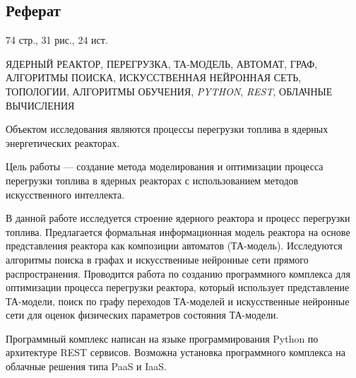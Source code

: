 \begin{center}
\section*{Реферат}
\end{center}

\vspace{2em}
74 стр., 31 рис., 24 ист.

\vspace{2em}
ЯДЕРНЫЙ РЕАКТОР, ПЕРЕГРУЗКА, ТА-МОДЕЛЬ, АВТОМАТ, ГРАФ, АЛГОРИТМЫ ПОИСКА, ИСКУССТВЕННАЯ НЕЙРОННАЯ СЕТЬ, ТОПОЛОГИИ, АЛГОРИТМЫ ОБУЧЕНИЯ, \textit{PYTHON}, \textit{REST}, ОБЛАЧНЫЕ ВЫЧИСЛЕНИЯ


\vspace{2em}
Объектом исследования являются процессы перегрузки топлива в ядерных энергетических реакторах.

Цель работы --- создание метода моделирования и оптимизации процесса перегрузки топлива в ядерных реакторах с использованием методов искусственного интеллекта.

В данной работе исследуется строение ядерного реактора и процесс перегрузки топлива.
Предлагается формальная информационная модель реактора на основе представления реактора как композиции автоматов (ТА-модель).
Исследуются алгоритмы поиска в графах и искусственные нейронные сети прямого распространения.
Проводится работа по созданию программного комплекса для оптимизации процесса перегрузки реактора, который использует представление ТА-модели, поиск по графу переходов ТА-моделей и искусственные нейронные сети для оценок физических параметров состояния ТА-модели.

Программный комплекс написан на языке программирования Python по архитектуре REST сервисов.
Возможна установка программного комплекса на облачные решения типа PaaS и IaaS.

\newpage